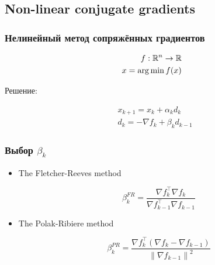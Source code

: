 \subsection{Non-linear conjugate gradients}

%
%
%
%

\begin{frame}
   \frametitle{Нелинейный метод сопряжённых градиентов}
    \begin{align*}
      f : \mathbb{R}^n \rightarrow \mathbb{R} \\
      x = \operatorname*{arg\,min} f(x)
    \end{align*}

    Решение:

    \begin{align*}
      & x _{k+1} = x_k + \alpha_k d_k \\
      & d_k = -\nabla f_k + \beta_k d_{k-1}
    \end{align*}

\end{frame}

\begin{frame}
  \frametitle{Выбор $\beta_k$}

  \begin{itemize}
    \item The Fletcher-Reeves method

      \begin{equation*}
        \beta_k^{FR} = \frac{\nabla f_k^\intercal \nabla f_k}{\nabla f_{k-1}^\intercal \nabla f_{k-1} }
      \end{equation*}
    \item The Polak-Ribiere method

      \begin{equation*}
        \beta_k^{PR} = \frac{\nabla f_k^\intercal \left( \nabla f_k - \nabla f_{k-1} \right)}{\left\|\nabla f_{k-1} \right\|^2}
      \end{equation*}


  \end{itemize}

\end{frame}
